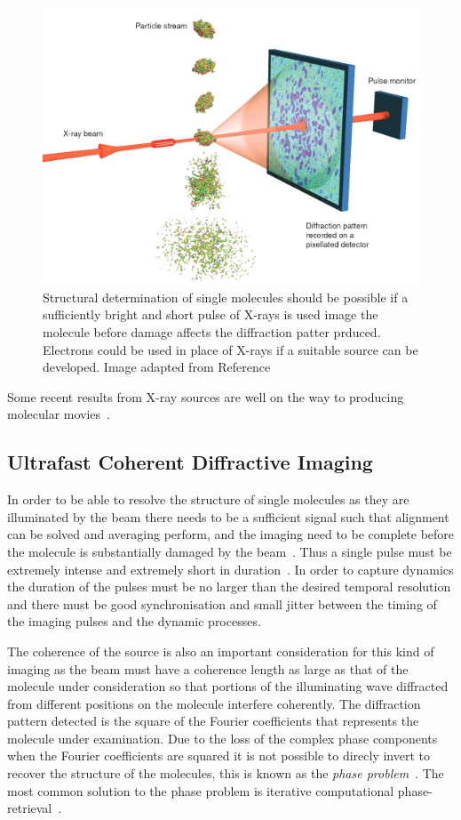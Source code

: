 \begin{figure}
    \center
    \includegraphics[width=0.65\linewidth]{0intro/Figs/single_molecule_cdi.jpg}
    \caption{Structural determination of single molecules should be possible if a sufficiently bright and short pulse of X-rays is used image the molecule before damage affects the diffraction patter prduced. Electrons could be used in place of X-rays if a suitable source can be developed. Image adapted from Reference~\cite{gaffney_imaging_2007}}
    \label{figure:molecule_cdi}
\end{figure}

Some recent results from X-ray sources are well on the way to producing molecular movies~\cite{pande_femtosecond_2016,nango_three-dimensional_2016}.

\subsection{Ultrafast Coherent Diffractive Imaging}

In order to be able to resolve the structure of single molecules as they are illuminated by the beam there needs to be a sufficient signal such that alignment can be solved and averaging perform, and the imaging need to be complete before the molecule is substantially damaged by the beam~\cite{huldt_diffraction_2003}. Thus a single pulse must be extremely intense and extremely short in duration~\cite{chapman_femtosecond_2006}.
In order to capture dynamics the duration of the pulses must be no larger than the desired temporal resolution and there must be good synchronisation and small jitter between the timing of the imaging pulses and the dynamic processes.

The coherence of the source is also an important consideration for this kind of imaging as the beam must have a coherence length as large as that of the molecule under consideration so that portions of the illuminating wave diffracted from different positions on the molecule interfere coherently.
The diffraction pattern detected is the square of the Fourier coefficients that represents the molecule under examination.
Due to the loss of the complex phase components when the Fourier coefficients are squared it is not possible to direcly invert to recover the structure of the molecules, this is known as the \emph{phase problem}~\cite{rodenburg_phase_1989}.
The most common solution to the phase problem is iterative computational phase-retrieval~\cite{chapman_coherent_2010}.

